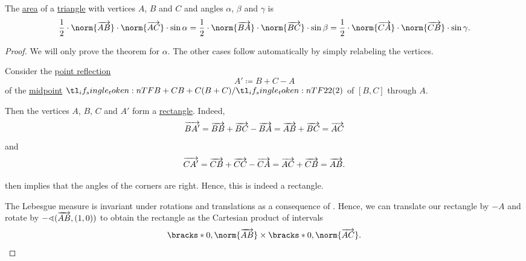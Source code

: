 \begin{proposition}\label{thm:area_of_triangle}
  The \hyperref[def:figure_area]{area} of a \hyperref[def:triangle]{triangle} with vertices \( A \), \( B \) and \( C \) and angles \( \alpha \), \( \beta \) and \( \gamma \) is
  \begin{equation}\label{eq:thm:area_of_triangle}
    \frac 1 2 \cdot \norm{\vect{AB}} \cdot \norm{\vect{AC}} \cdot \sin \alpha = \frac 1 2 \cdot \norm{\vect{BA}} \cdot \norm{\vect{BC}} \cdot \sin \beta = \frac 1 2 \cdot \norm{\vect{CA}} \cdot \norm{\vect{CB}} \cdot \sin \gamma.
  \end{equation}
\end{proposition}
\begin{proof}
  We will only prove the theorem for \( \alpha \). The other cases follow automatically by simply relabeling the vertices.

   Consider the \hyperref[def:rigid_motion/point_reflection]{point reflection}
  \begin{equation*}
    A' \coloneqq B + C - A
  \end{equation*}
  of the \hyperref[def:midpoint]{midpoint} \( \ifrac {B + C} 2 \) of \( [B, C] \) through \( A \).

  Then the vertices \( A \), \( B \), \( C \) and \( A' \) form a \hyperref[def:parallelogram/rectangle]{rectangle}. Indeed,
  \begin{equation*}
    \overrightarrow{BA'} = \overrightarrow{BB} + \overrightarrow{BC} - \overrightarrow{BA} = \overrightarrow{AB} + \overrightarrow{BC} = \overrightarrow{AC}
  \end{equation*}
  and
  \begin{equation*}
    \overrightarrow{CA'} = \overrightarrow{CB} + \overrightarrow{CC} - \overrightarrow{CA} = \overrightarrow{AC} + \overrightarrow{CB} = \overrightarrow{AB}.
  \end{equation*}

   then implies that the angles of the corners are right. Hence, this is indeed a rectangle.

  The Lebesgue measure is invariant under rotations and translations as a consequence of . Hence, we can translate our rectangle by \( -A \) and rotate by \( -\sphericalangle(\overrightarrow{AB}, (1, 0)) \) to obtain the rectangle as the Cartesian product of intervals
  \begin{equation*}
    \bracks*{ 0, \norm{\vect{AB}} } \times \bracks*{ 0, \norm{\vect{AC}} }.
  \end{equation*}


\end{proof}
